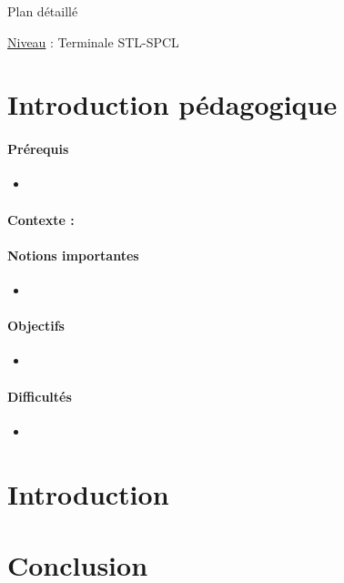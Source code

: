 \begin{reportBlock}{Plan détaillé}

\underline{Niveau} : Terminale STL-SPCL \\

\section*{Introduction pédagogique}


\paragraph*{Prérequis}
\begin{itemize}
\item 
\end{itemize}
\paragraph*{Contexte :}


\paragraph*{Notions importantes}

\begin{itemize}
\item 
\end{itemize}

\paragraph*{Objectifs}

\begin{itemize}
\item 
\end{itemize}

\paragraph*{Difficultés}

\begin{itemize}
\item 
\end{itemize}

\section*{Introduction}

\section{}

\section*{Conclusion} 

\end{reportBlock}